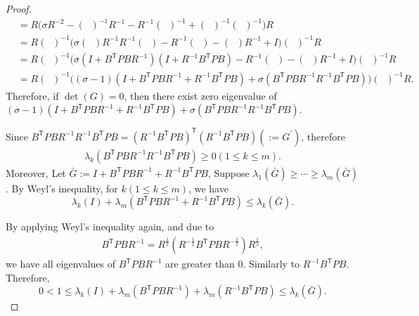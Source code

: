 \documentclass{article}
\newcommand{\transpose}{\mathsf{T}}
\DeclareMathOperator{\tempRBP}{R + B^{\transpose}PB}
\begin{document}
\begin{proof}
\begin{align*}
        &= R\bigg(\sigma R^{-2} - (\tempRBP)^{-1}R^{-1} - R^{-1}(\tempRBP)^{-1} + (\tempRBP)^{-1}(\tempRBP)^{-1} \bigg)R\\
        &= R(\tempRBP)^{-1}\bigg(\sigma(\tempRBP)R^{-1}R^{-1}(\tempRBP) - R^{-1}(\tempRBP) - (\tempRBP)R^{-1} + I \bigg)(\tempRBP)^{-1}R\\
        &= R(\tempRBP)^{-1}\bigg(\sigma(I+B^{\transpose}PBR^{-1})(I+R^{-1}B^{\transpose}PB) - R^{-1}(\tempRBP) - (\tempRBP)R^{-1} + I \bigg)(\tempRBP)^{-1}R\\
        &= R(\tempRBP)^{-1}\bigg((\sigma-1)(I+B^{\transpose}PBR^{-1}+R^{-1}B^{\transpose}PB) + \sigma(B^{\transpose}PBR^{-1}R^{-1}B^{\transpose}PB)\bigg)(\tempRBP)^{-1}R.
    \end{align*}
    Therefore, if $\det(G) = 0$, then there exist zero eigenvalue of $(\sigma-1)(I+B^{\transpose}PBR^{-1}+R^{-1}B^{\transpose}PB) + \sigma(B^{\transpose}PBR^{-1}R^{-1}B^{\transpose}PB)$.

    Since $B^{\transpose}PBR^{-1}R^{-1}B^{\transpose}PB = (R^{-1}B^{\transpose}PB)^{\transpose}(R^{-1}B^{\transpose}PB)(:= G^{'})$, therefore
    \begin{align*}
        \lambda_{k}(B^{\transpose}PBR^{-1}R^{-1}B^{\transpose}PB) \geq 0(1\leq k \leq m).
    \end{align*}
    Moreover, Let $\bar{G} := I+B^{\transpose}PBR^{-1}+R^{-1}B^{\transpose}PB$, 
    Suppose $\lambda_{1}(\bar{G}) \geq \cdots \geq \lambda_{m}(\bar{G})$. By Weyl's inequality, for $k(1\leq k \leq m)$, we have
    \begin{equation}\label{eq:eigenStep3}
        \lambda_{k}(I) + \lambda_{m}(B^{\transpose}PBR^{-1}+R^{-1}B^{\transpose}PB) \leq \lambda_{k}(\bar{G}).
    \end{equation}
    
    By applying Weyl's inequality again, and due to 
    \begin{align*}
        B^{\transpose}PBR^{-1} = R^{\frac{1}{2}}(R^{-\frac{1}{2}}B^{\transpose}PBR^{-\frac{1}{2}})R^{\frac{1}{2}},
    \end{align*}
    we have all eigenvalues of $B^{\transpose}PBR^{-1}$ are greater than 0. Similarly to $R^{-1}B^{\transpose}PB$.
    Therefore,
    \begin{equation}\label{eq:eigenStep4}
        0 < 1 \leq \lambda_{k}(I) + \lambda_{m}(B^{\transpose}PBR^{-1})+\lambda_{m}(R^{-1}B^{\transpose}PB) \leq \lambda_{k}(\bar{G}).
    \end{equation}


\end{proof}
\end{document}
